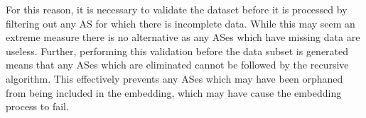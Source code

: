 For this reason, it is necessary to validate the dataset before it is processed by filtering out any AS for which there is incomplete data. While this may seem an extreme measure there is no alternative as any ASes which have missing data are useless. Further, performing this validation before the data subset is generated means that any ASes which are eliminated cannot be followed by the recursive algorithm. This effectively prevents any ASes which may have been orphaned from being included in the embedding, which may have cause the embedding process to fail. 
